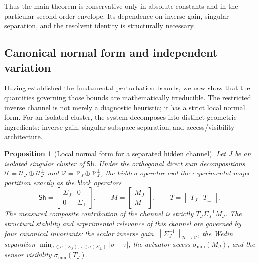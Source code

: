 \documentclass[review]{siamart220329}
\newtheorem{proposition}[theorem]{Proposition}
\theoremstyle{definition}
\theoremstyle{remark}
\newcommand{\calU}{\mathcal{U}}
\newcommand{\calV}{\mathcal{V}}
\newcommand{\Sh}{\mathsf{Sh}}
\newcommand{\smin}{\sigma_{\min}}
\newcommand{\norm}[1]{\left\lVert #1\right\rVert}
\begin{document}
Thus the main theorem is conservative only in absolute constants and in the
particular second-order envelope. Its dependence on inverse gain, singular
separation, and the resolvent identity is structurally necessary.

\subsection{Canonical normal form and independent variation}\label{sec:decoupling}

Having established the fundamental perturbation bounds, we now show that the
quantities governing those bounds are mathematically irreducible. The restricted
inverse channel is not merely a diagnostic heuristic; it has a strict local
normal form. For an isolated cluster, the system decomposes into
distinct geometric ingredients: inverse gain, singular-subspace separation, and
access/visibility architecture.

\begin{proposition}[Local normal form for a separated hidden channel]
\label{prop:normal-form}
Let $J$ be an isolated singular cluster of $\Sh$. Under the orthogonal direct
sum decompositions $\calU=\calU_J\oplus\calU_J^\perp$ and
$\calV=\calV_J\oplus\calV_J^\perp$, the hidden operator and the experimental
maps partition exactly as the block operators
\begin{equation}
    \Sh =
    \begin{bmatrix}
    \Sigma_J & 0\\
    0 & \Sigma_\perp
    \end{bmatrix},
    \qquad
    M =
    \begin{bmatrix}
    M_J\\
    M_\perp
    \end{bmatrix},
    \qquad
    T =
    \begin{bmatrix}
    T_J & T_\perp
    \end{bmatrix}.
\end{equation}
The measured composite contribution of the channel is strictly
$T_J\Sigma_J^{-1}M_J$. The structural stability and experimental relevance of
this channel are governed by four canonical invariants: the scalar inverse gain
$\norm{\Sigma_J^{-1}}_{\calU\to\calV}$, the Wedin separation
$\min_{\sigma\in\sigma(\Sigma_J),\,\tau\in\sigma(\Sigma_\perp)}|\sigma-\tau|$, the actuator access
$\smin(M_J)$, and the sensor visibility $\smin(T_J)$.
\end{proposition}
\end{document}
